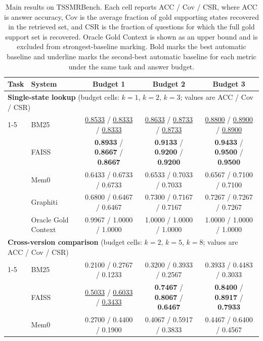 \begin{table}[t]
\centering
\small
\caption{Main results on TSSMRBench. Each cell reports ACC / Cov / CSR, where ACC is answer accuracy, Cov is the average fraction of gold supporting states recovered in the retrieved set, and CSR is the fraction of questions for which the full gold support set is recovered. Oracle Gold Context is shown as an upper bound and is excluded from strongest-baseline marking. Bold marks the best automatic baseline and underline marks the second-best automatic baseline for each metric under the same task and answer budget.}
\label{tab:overall-expanded}
\setlength{\tabcolsep}{6pt}
\begin{tabular*}{\textwidth}{@{\extracolsep{\fill}}llccc@{}}
\toprule
Task & System & Budget 1 & Budget 2 & Budget 3 \\
\midrule
\multicolumn{5}{l}{\textbf{Single-state lookup} (budget cells: $k=1$, $k=2$, $k=3$; values are ACC / Cov / CSR)} \\
\cmidrule(lr){1-5}
\multirow{5}{*}{Single} & BM25 & \underline{0.8533} / \underline{0.8333} / \underline{0.8333} & \underline{0.8633} / \underline{0.8733} / \underline{0.8733} & \underline{0.8800} / \underline{0.8900} / \underline{0.8900} \\
 & FAISS & \textbf{0.8933} / \textbf{0.8667} / \textbf{0.8667} & \textbf{0.9133} / \textbf{0.9200} / \textbf{0.9200} & \textbf{0.9433} / \textbf{0.9500} / \textbf{0.9500} \\
 & Mem0 & 0.6433 / 0.6733 / 0.6733 & 0.6533 / 0.7033 / 0.7033 & 0.6567 / 0.7100 / 0.7100 \\
 & Graphiti & 0.6800 / 0.6467 / 0.6467 & 0.7300 / 0.7167 / 0.7167 & 0.7267 / 0.7267 / 0.7267 \\
 & Oracle Gold Context & 0.9967 / 1.0000 / 1.0000 & 1.0000 / 1.0000 / 1.0000 & 1.0000 / 1.0000 / 1.0000 \\
\midrule
\multicolumn{5}{l}{\textbf{Cross-version comparison} (budget cells: $k=2$, $k=5$, $k=8$; values are ACC / Cov / CSR)} \\
\cmidrule(lr){1-5}
\multirow{5}{*}{Cross} & BM25 & 0.2100 / 0.2767 / 0.1233 & 0.3200 / 0.3933 / 0.2567 & 0.3933 / 0.4483 / 0.3033 \\
 & FAISS & \underline{0.5033} / \underline{0.6033} / \underline{0.3433} & \textbf{0.7467} / \textbf{0.8067} / \textbf{0.6467} & \textbf{0.8400} / \textbf{0.8917} / \textbf{0.7933} \\
 & Mem0 & 0.2700 / 0.4400 / 0.1900 & 0.4067 / 0.5917 / 0.3833 & 0.4467 / 0.6400 / 0.4567 \\

\end{tabular*}
\end{table}
